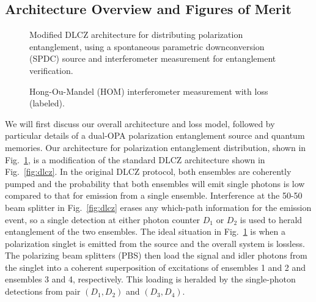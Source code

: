 \documentclass[aps,twocolumn,secnumarabic,amsmath,amssymb,pra,groupedaddress,
showpacs, showkeys]{revtex4-1}
\newcommand{\pna}[1]{\left(#1\right)}
\begin{document}
\subsection{Architecture Overview and Figures of Merit\label{sec:herald:overview}}

\begin{figure}[t]
	\centering
	\resizebox{6.50in}{!}{}
	\caption{Modified DLCZ architecture for distributing polarization entanglement, using a spontaneous parametric downconversion (SPDC) source and  interferometer measurement for entanglement verification.}
	\label{fig:channel_model}
\end{figure}

\begin{figure}[htb]
	\centering
	\resizebox{6.50in}{!}{}
	\caption{Hong-Ou-Mandel (HOM) interferometer measurement with loss (labeled).}
	\label{fig:channel_loss_model}
\end{figure}

We will first discuss our overall architecture and loss model, followed by
particular details of a dual-OPA polarization entanglement source and quantum
memories. Our architecture for polarization entanglement distribution, shown in
Fig.~\ref{fig:channel_model}, is a modification of the standard DLCZ
architecture shown in Fig.~\ref{fig:dlcz}. In the original DLCZ protocol, both
ensembles are coherently pumped and the probability that both ensembles will
emit single photons is low compared to that for emission from a single
ensemble. Interference at the 50-50 beam splitter in Fig.~\ref{fig:dlcz} erases
any which-path information for the emission event, so a single detection at
either photon counter $D_1$ or $D_2$ is used to herald entanglement of the two
ensembles. The ideal situation in Fig.~\ref{fig:channel_model} is when a
polarization singlet is emitted from the source and the overall system is
lossless. The polarizing beam splitters (PBS) then load the signal and idler
photons from the singlet into a coherent superposition of excitations of
ensembles 1 and 2 and ensembles 3 and 4, respectively. This loading is heralded
by the single-photon detections from pair $\pna{D_1, D_2}$ and $\pna{D_3,
  D_4}$.
\end{document}
